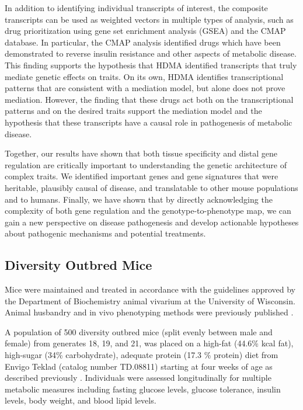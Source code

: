 \documentclass[
]{article}
\begin{document}
In addition to identifying individual transcripts of interest, the
composite transcripts can be used as weighted vectors in multiple types
of analysis, such as drug prioritization using gene set enrichment
analysis (GSEA) and the CMAP database. In particular, the CMAP analysis
identified drugs which have been demonstrated to reverse insulin
resistance and other aspects of metabolic disease. This finding supports
the hypothesis that HDMA identified transcripts that truly mediate
genetic effects on traits. On its own, HDMA identifies transcriptional
patterns that are consistent with a mediation model, but alone does not
prove mediation. However, the finding that these drugs act both on the
transcriptional patterns and on the desired traits support the mediation
model and the hypothesis that these transcripts have a causal role in
pathogenesis of metabolic disease.

Together, our results have shown that both tissue specificity and distal
gene regulation are critically important to understanding the genetic
architecture of complex traits. We identified important genes and gene
signatures that were heritable, plausibly causal of disease, and
translatable to other mouse populations and to humans. Finally, we have
shown that by directly acknowledging the complexity of both gene
regulation and the genotype-to-phenotype map, we can gain a new
perspective on disease pathogenesis and develop actionable hypotheses
about pathogenic mechanisms and potential treatments.

\subsection{Diversity Outbred Mice}\label{diversity-outbred-mice}

Mice were maintained and treated in accordance with the guidelines
approved by the Department of Biochemistry animal vivarium at the
University of Wisconsin. Animal husbandry and in vivo phenotyping
methods were previously published \cite{pmid31343992, pmid29567659}.

A population of 500 diversity outbred mice (split evenly between male
and female) from generates 18, 19, and 21, was placed on a high-fat
(44.6\% kcal fat), high-sugar (34\% carbohydrate), adequate protein
(17.3 \% protein) diet from Envigo Teklad (catalog number TD.08811)
starting at four weeks of age as described previously
\cite{pmid29567659}. Individuals were assessed longitudinally for
multiple metabolic measures including fasting glucose levels, glucose
tolerance, insulin levels, body weight, and blood lipid levels.
\end{document}
